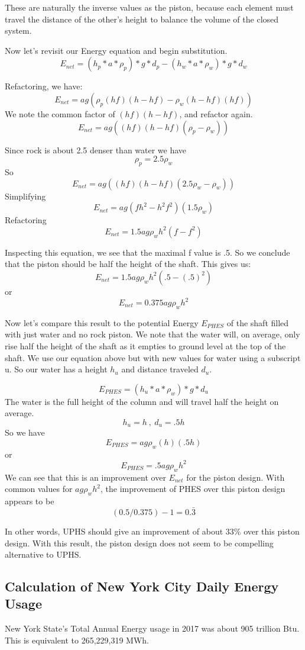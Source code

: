 These are naturally the inverse values as the piston, because each element must travel the distance of the other's height to balance the volume of the closed system.

Now let's revisit our Energy equation and begin substitution.
\[ E_{net} = (h_p*a*\rho_p)*g*d_p - (h_w*a*\rho_w)*g*d_w  \]

Refactoring, we have:
\[ E_{net} = ag(\rho_p(hf)(h-hf) - \rho_w(h-hf)(hf)) \]
We note the common factor of $(hf)(h-hf)$, and refactor again.
\[ E_{net} = ag((hf)(h-hf)(\rho_p - \rho_w)) \]

Since rock is about 2.5 denser than water we have
\[ \rho_p = 2.5\rho_w \]
So
\[ E_{net} = ag((hf)(h-hf)(2.5\rho_w - \rho_w)) \]
Simplifying
\[ E_{net} = ag(fh^2 - h^2f^2)(1.5\rho_w) \]
Refactoring
\[ E_{net} = 1.5ag\rho_wh^2(f - f^2) \]

Inspecting this equation, we see that the maximal f value is .5. So we conclude that the piston should be half the height of the shaft. This gives us:
\[ E_{net} = 1.5ag\rho_wh^2(.5 - (.5)^2) \]
or
\[ E_{net} = 0.375ag\rho_wh^2 \]

Now let's compare this result to the potential Energy $E_{PHES}$ of the shaft filled with just water and no rock piston. We note that the water will, on average, only rise half the height of the shaft as it empties to ground level at the top of the shaft. We use our equation above but with new values for water using a subscript u. So our water has a height $h_u$ and distance traveled $d_u$.

\[ E_{PHES} = (h_u*a*\rho_w)*g*d_u \]
The water is the full height of the column and will travel half the height on average.
\[ h_u = h \ , \ d_u = .5h \]
So we have
\[ E_{PHES} = ag\rho_w(h)(.5h) \]
or
\[ E_{PHES} = .5ag\rho_wh^2 \]
We can see that this is an improvement over $E_{net}$ for the piston design. With common values for $ag\rho_wh^2$, the improvement of PHES over this piston design appears to be
\[ (0.5 / 0.375) - 1 = 0.\bar3 \]

In other words, UPHS should give an improvement of about 33\% over this piston design. With this result, the piston design does not seem to be compelling alternative to UPHS.

\subsection{Calculation of New York City Daily Energy Usage}
New York State's Total Annual Energy usage in 2017 was about 905 trillion Btu\cite{NewYorkStateEnergyProfile}. This is equivalent to 265,229,319 MWh.

